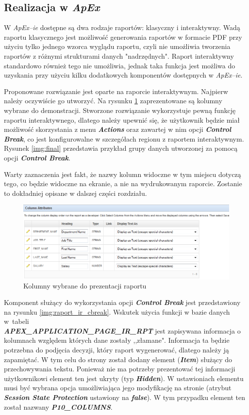 \documentclass[11pt,a4paper]{article}
\begin{document}
\subsection{Realizacja w \emph{ApEx}} \label{test:apex}
W \emph{ApEx--ie} dostępne są dwa rodzaje raportów: klasyczny i interaktywny. Wadą raportu klasycznego jest możliwość generowania raportów w formacie PDF przy użyciu tylko jednego wzorca wyglądu raportu, czyli nie umożliwia tworzenia raportów z różnymi strukturami danych "nadrzędnych". Raport interaktywny standardowo również tego nie umożliwia, jednak taka funkcja jest możliwa do uzyskania przy użyciu kilku dodatkowych komponentów dostępnych w \emph{ApEx--ie}. 


Proponowane rozwiązanie jest oparte na raporcie interaktywnym. Najpierw należy oczywiście go utworzyć. Na rysunku \ref{img:raport_ir_dane} zaprezentowane są kolumny wybrane do demonstracji. Stworzone rozwiązanie wykorzystuje pewną funkcję raportu interaktywnego, dlatego należy upewnić się, że użytkownik będzie miał możliwość skorzystania z menu \emph{\textbf{Actions}} oraz zawartej w nim opcji \emph{\textbf{Control Break}}, co jest konfigurowalne w szczegółach regionu z raportem interaktywnym. Rysunek \ref{img:final} przedstawia przykład grupy danych utworzonej za pomocą opcji \emph{\textbf{Control Break}}. 

Warty zaznaczenia jest fakt, że nazwy kolumn widoczne w tym miejscu dotyczą tego, co będzie widoczne na ekranie, a nie na wydrukowanym raporcie. Zostanie to dokładniej opisane w dalszej części rozdziału.

\begin{figure}[h]
\centering
\includegraphics[scale=0.7]{ir_dane}
\caption{Kolumny wybrane do prezentacji raportu}
\label{img:raport_ir_dane}
\end{figure}

Komponent służący do wykorzystania opcji \emph{\textbf{Control Break}} jest przedstawiony na rysunku \ref{img:raport_ir_cbreak}. Wskutek użycia funkcji w bazie danych w~tabeli\\ \emph{\textbf{APEX\_APPLICATION\_PAGE\_IR\_RPT}} jest zapisywana informacja o kolumnach względem których dane zostały ,,złamane". Informacja ta będzie potrzebna do podjęcia decyzji, który raport wygenerować, dlatego należy ją zapamiętać. W tym celu do strony został dodany element (\emph{\textbf{Item}}) służący do przechowywania tekstu. Ponieważ nie ma potrzeby prezentować tej informacji użytkownikowi element ten jest ukryty (typ \emph{\textbf{Hidden}}). W ustawioniach elementu musi być wybrana opcja umożliwiająca jego modyfikację na stronie (atrybut \emph{\textbf{Session State Protection}} ustawiony na \emph{\textbf{false}}).  W tym przypadku element ten został nazwany \emph{\textbf{P10\_COLUMNS}}.
\end{document}
